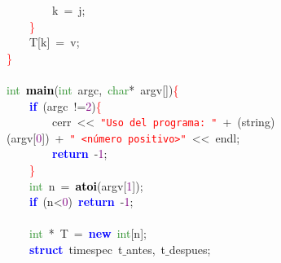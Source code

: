 \mbox{}\ \ \ \ \ \ \ \ k\ \textcolor{BrickRed}{=}\ j\textcolor{BrickRed}{;} \\
\mbox{}\ \ \ \ \textcolor{Red}{\}} \\
\mbox{}\ \ \ \ T\textcolor{BrickRed}{[}k\textcolor{BrickRed}{]}\ \textcolor{BrickRed}{=}\ v\textcolor{BrickRed}{;} \\
\mbox{}\textcolor{Red}{\}} \\
\mbox{} \\
\mbox{}\textcolor{ForestGreen}{int}\ \textbf{\textcolor{Black}{main}}\textcolor{BrickRed}{(}\textcolor{ForestGreen}{int}\ argc\textcolor{BrickRed}{,}\ \textcolor{ForestGreen}{char}\textcolor{BrickRed}{*}\ argv\textcolor{BrickRed}{[])}\textcolor{Red}{\{} \\
\mbox{}\ \ \ \ \textbf{\textcolor{Blue}{if}}\ \textcolor{BrickRed}{(}argc\ \textcolor{BrickRed}{!=}\textcolor{Purple}{2}\textcolor{BrickRed}{)}\textcolor{Red}{\{} \\
\mbox{}\ \ \ \ \ \ \ \ cerr\ \textcolor{BrickRed}{\textless{}\textless{}}\ \texttt{\textcolor{Red}{"{}Uso\ del\ programa:\ "{}}}\ \textcolor{BrickRed}{+}\ \textcolor{BrickRed}{(}string\textcolor{BrickRed}{)(}argv\textcolor{BrickRed}{[}\textcolor{Purple}{0}\textcolor{BrickRed}{])}\ \textcolor{BrickRed}{+}\ \texttt{\textcolor{Red}{"{}\ \textless{}número\ positivo\textgreater{}"{}}}\ \textcolor{BrickRed}{\textless{}\textless{}}\ endl\textcolor{BrickRed}{;}\ \  \\
\mbox{}\ \ \ \ \ \ \ \ \textbf{\textcolor{Blue}{return}}\ \textcolor{BrickRed}{-}\textcolor{Purple}{1}\textcolor{BrickRed}{;} \\
\mbox{}\ \ \ \ \textcolor{Red}{\}} \\
\mbox{}\ \ \ \ \textcolor{ForestGreen}{int}\ n\ \textcolor{BrickRed}{=}\ \textbf{\textcolor{Black}{atoi}}\textcolor{BrickRed}{(}argv\textcolor{BrickRed}{[}\textcolor{Purple}{1}\textcolor{BrickRed}{]);}\ \ \ \  \\
\mbox{}\ \ \ \ \textbf{\textcolor{Blue}{if}}\ \textcolor{BrickRed}{(}n\textcolor{BrickRed}{\textless{}}\textcolor{Purple}{0}\textcolor{BrickRed}{)}\ \textbf{\textcolor{Blue}{return}}\ \textcolor{BrickRed}{-}\textcolor{Purple}{1}\textcolor{BrickRed}{;} \\
\mbox{}\ \ \ \  \\
\mbox{}\ \ \ \ \textcolor{ForestGreen}{int}\ \textcolor{BrickRed}{*}\ T\ \textcolor{BrickRed}{=}\ \textbf{\textcolor{Blue}{new}}\ \textcolor{ForestGreen}{int}\textcolor{BrickRed}{[}n\textcolor{BrickRed}{];} \\
\mbox{}\ \ \ \ \textbf{\textcolor{Blue}{struct}}\ \textcolor{TealBlue}{timespec}\ t$\_$antes\textcolor{BrickRed}{,}\ t$\_$despues\textcolor{BrickRed}{;} \\
